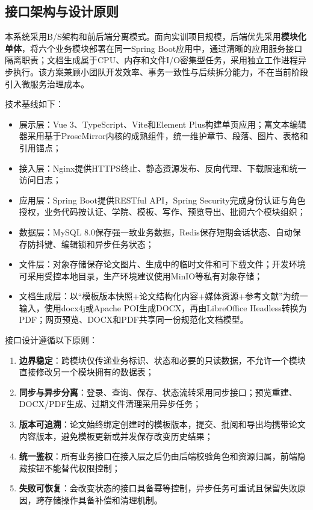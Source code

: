 \documentclass{../template/softeng}
\begin{document}
	\subsection{接口架构与设计原则}
	本系统采用B/S架构和前后端分离模式。面向实训项目规模，后端优先采用\textbf{模块化单体}，将六个业务模块部署在同一Spring Boot应用中，通过清晰的应用服务接口隔离职责；文档生成属于CPU、内存和文件I/O密集型任务，采用独立工作进程异步执行。该方案兼顾小团队开发效率、事务一致性与后续拆分能力，不在当前阶段引入微服务治理成本。
	
	技术基线如下：
	\begin{itemize}
		\item 展示层：Vue 3、TypeScript、Vite和Element Plus构建单页应用；富文本编辑器采用基于ProseMirror内核的成熟组件，统一维护章节、段落、图片、表格和引用锚点；
		\item 接入层：Nginx提供HTTPS终止、静态资源发布、反向代理、下载限速和统一访问日志；
		\item 应用层：Spring Boot提供RESTful API，Spring Security完成身份认证与角色授权，业务代码按认证、学院、模板、写作、预览导出、批阅六个模块组织；
		\item 数据层：MySQL 8.0保存强一致业务数据，Redis保存短期会话状态、自动保存防抖键、编辑锁和异步任务状态；
		\item 文件层：对象存储保存论文图片、生成中的临时文件和可下载文件；开发环境可采用受控本地目录，生产环境建议使用MinIO等私有对象存储；
		\item 文档生成层：以“模板版本快照+论文结构化内容+媒体资源+参考文献”为统一输入，使用docx4j或Apache POI生成DOCX，再由LibreOffice Headless转换为PDF；网页预览、DOCX和PDF共享同一份规范化文档模型。
	\end{itemize}
	
	接口设计遵循以下原则：
	\begin{enumerate}
		\item \textbf{边界稳定}：跨模块仅传递业务标识、状态和必要的只读数据，不允许一个模块直接修改另一个模块拥有的数据表；
		\item \textbf{同步与异步分离}：登录、查询、保存、状态流转采用同步接口；预览重建、DOCX/PDF生成、过期文件清理采用异步任务；
		\item \textbf{版本可追溯}：论文始终绑定创建时的模板版本，提交、批阅和导出均携带论文内容版本，避免模板更新或并发保存改变历史结果；
		\item \textbf{统一鉴权}：所有业务接口在接入层之后仍由后端校验角色和资源归属，前端隐藏按钮不能替代权限控制；
		\item \textbf{失败可恢复}：会改变状态的接口具备幂等控制，异步任务可重试且保留失败原因，跨存储操作具备补偿和清理机制。
	\end{enumerate}
	
\end{document}
